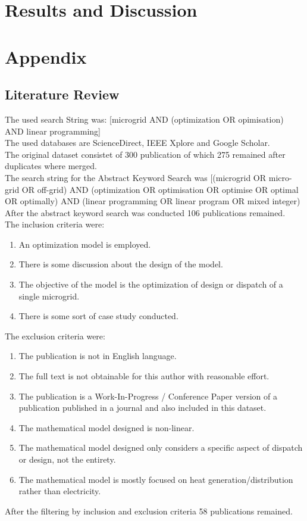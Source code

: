 \documentclass[
	11pt,								%
	DIV10,								%
	a4paper,         					%
	oneside,							%
	headheight=20pt,					%
	footheight=20pt,					%
    parskip=full,						%
    listof=totoc,						%
	bibliography=totoc,					%
	index=totoc,						%
]{scrartcl}
\begin{document}
\newpage
\section{Results and Discussion}
\newpage


\section{Appendix}
\subsection{Literature Review}
The used search String was:  [microgrid AND (optimization OR opimisation) AND linear programming]
\\
The used databases are ScienceDirect, IEEE Xplore and Google Scholar.
\\
The original dataset consistet of 300 publication of which 275 remained after duplicates where merged.
\\
The search string for the Abstract Keyword Search was [(microgrid OR micro-grid OR off-grid) AND (optimization OR optimisation OR optimise OR optimal OR optimally) AND (linear programming OR linear program OR mixed integer)
\\
After the abstract keyword search was conducted 106 publications remained.
\\
The inclusion criteria were:
\begin{enumerate}
	\item An optimization model is employed.
	\item There is some discussion about the design of the model.
	\item The objective of the model is the optimization of design or dispatch of a single microgrid.
	\item There is some sort of case study conducted.
\end{enumerate}
The exclusion criteria were:
\begin{enumerate}
	\item The publication is not in English language.
	\item The full text is not obtainable for this author with reasonable effort.
	\item The publication is a Work-In-Progress / Conference Paper version of a publication published in a journal and also included in this dataset.
	\item The mathematical model designed is non-linear.
	\item The mathematical model designed only considers a specific aspect of dispatch or design, not the entirety.
	\item The mathematical model is mostly focused on heat generation/distribution rather than electricity.
\end{enumerate}
After the filtering by inclusion and exclusion criteria 58 publications remained.


\renewcommand\refname{Literature}			%
\printbibliography
\end{document}
